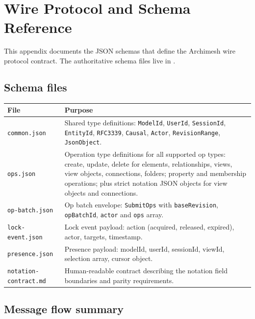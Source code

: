 \section{Wire Protocol and Schema Reference}
\label{sec:AppendixSchemas}

This appendix documents the JSON schemas that define the Archimesh wire
protocol contract. The authoritative schema files live in
.

\subsection{Schema files}

\begin{longtable}{p{42mm}p{112mm}}
\toprule
File & Purpose \\
\midrule
\texttt{common.json} & Shared type definitions: \texttt{ModelId},
  \texttt{UserId}, \texttt{SessionId}, \texttt{EntityId},
  \texttt{RFC3339}, \texttt{Causal}, \texttt{Actor},
  \texttt{RevisionRange}, \texttt{JsonObject}. \\
\texttt{ops.json} & Operation type definitions for all supported op types:
  create, update, delete for elements, relationships, views, view objects,
  connections, folders; property and membership operations; plus strict
  notation JSON objects for view objects and connections. \\
\texttt{op-batch.json} & Op batch envelope: \texttt{SubmitOps} with
  \texttt{baseRevision}, \texttt{opBatchId}, \texttt{actor} and
  \texttt{ops} array. \\
\texttt{lock-event.json} & Lock event payload: action (acquired, released,
  expired), actor, targets, timestamp. \\
\texttt{presence.json} & Presence payload: modelId, userId, sessionId,
  viewId, selection array, cursor object. \\
\texttt{notation-contract.md} & Human-readable contract describing the
  notation field boundaries and parity requirements. \\
\bottomrule
\end{longtable}

\subsection{Message flow summary}

